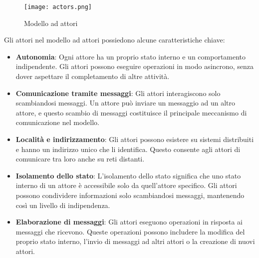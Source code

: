 \begin{figure}[!ht]
  \centering
  \texttt{[image: actors.png]}
  \caption[Modello ad attori]{Modello ad attori \cite{actors}}
\end{figure}

Gli attori nel modello ad attori possiedono alcune caratteristiche chiave:
\begin{itemize}
    \item \textbf{Autonomia}: Ogni attore ha un proprio stato interno e un comportamento indipendente.
    Gli attori possono eseguire operazioni in modo asincrono, senza dover aspettare il completamento di altre attività.
    \item \textbf{Comunicazione tramite messaggi}: Gli attori interagiscono solo scambiandosi messaggi.
    Un attore può inviare un messaggio ad un altro attore, e questo scambio di messaggi costituisce il principale meccanismo di comunicazione nel modello.
    \item \textbf{Località e indirizzamento}: Gli attori possono esistere su sistemi distribuiti e hanno un indirizzo unico che li identifica.
    Questo consente agli attori di comunicare tra loro anche su reti distanti.
    \item \textbf{Isolamento dello stato}: L'isolamento dello stato significa che uno stato interno di un attore è accessibile solo da quell'attore specifico.
    Gli attori possono condividere informazioni solo scambiandosi messaggi, mantenendo così un livello di indipendenza.
    \item \textbf{Elaborazione di messaggi}: Gli attori eseguono operazioni in risposta ai messaggi che ricevono.
    Queste operazioni possono includere la modifica del proprio stato interno, l'invio di messaggi ad altri attori o la creazione di nuovi attori.
\end{itemize}

